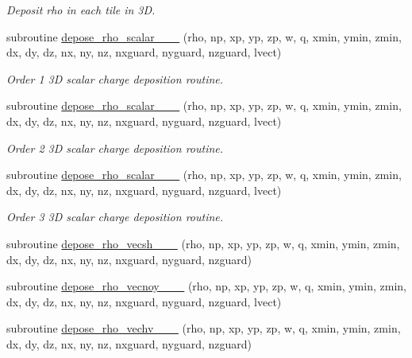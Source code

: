 \begin{DoxyCompactItemize}
\begin{DoxyCompactList}\small\item\em Deposit rho in each tile in 3D. \end{DoxyCompactList}\item 
subroutine \hyperlink{charge__deposition_8_f90_a448f1cab6e843064b45674d43a320022}{depose\+\_\+rho\+\_\+scalar\+\_\+\_\+\_} (rho, np, xp, yp, zp, w, q, xmin, ymin, zmin, dx, dy, dz, nx, ny, nz,                               nxguard, nyguard, nzguard, lvect)
\begin{DoxyCompactList}\small\item\em Order 1 3D scalar charge deposition routine. \end{DoxyCompactList}\item 
subroutine \hyperlink{charge__deposition_8_f90_a38e265fb630353694edfd86592922c74}{depose\+\_\+rho\+\_\+scalar\+\_\+\_\+\_} (rho, np, xp, yp, zp, w, q, xmin, ymin, zmin, dx, dy, dz, nx, ny, nz,                                   nxguard, nyguard, nzguard, lvect)
\begin{DoxyCompactList}\small\item\em Order 2 3D scalar charge deposition routine. \end{DoxyCompactList}\item 
subroutine \hyperlink{charge__deposition_8_f90_a7bc83de646747d60d464cd7bff59db9f}{depose\+\_\+rho\+\_\+scalar\+\_\+\_\+\_} (rho, np, xp, yp, zp, w, q, xmin, ymin, zmin, dx, dy, dz, nx, ny, nz,                                       nxguard, nyguard, nzguard, lvect)
\begin{DoxyCompactList}\small\item\em Order 3 3D scalar charge deposition routine. \end{DoxyCompactList}\item 
subroutine \hyperlink{charge__deposition_8_f90_af27f8c31c24d02ff56d5767f41c425cc}{depose\+\_\+rho\+\_\+vecsh\+\_\+\_\+\_} (rho, np, xp, yp, zp, w, q, xmin, ymin, zmin, dx, dy, dz, nx, ny, nz, nxguard, nyguard, nzguard)
\item 
subroutine \hyperlink{charge__deposition_8_f90_a570a05e74c2ed2a6fb9f9bf851e68390}{depose\+\_\+rho\+\_\+vecnoy\+\_\+\_\+\_} (rho, np, xp, yp, zp, w, q, xmin, ymin, zmin, dx, dy, dz, nx, ny, nz, nxguard, nyguard, nzguard, lvect)
\item 
subroutine \hyperlink{charge__deposition_8_f90_a9c1d09d89c39bd299a3b894dd419a9c6}{depose\+\_\+rho\+\_\+vechv\+\_\+\_\+\_} (rho, np, xp, yp, zp, w, q, xmin, ymin, zmin, dx, dy, dz, nx, ny, nz, nxguard, nyguard, nzguard)

\end{DoxyCompactItemize}
